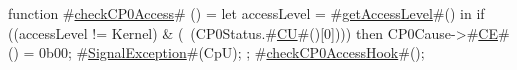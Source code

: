 function #\hyperref[sailMIPSzcheckCP0Access]{checkCP0Access}# () =
  {
    let accessLevel = #\hyperref[sailMIPSzgetAccessLevel]{getAccessLevel}#() in
    if ((accessLevel != Kernel) & (~(CP0Status.#\hyperref[sailMIPSzCU]{CU}#()[0]))) then
      {
        CP0Cause->#\hyperref[sailMIPSzCE]{CE}#() = 0b00;
        #\hyperref[sailMIPSzSignalException]{SignalException}#(CpU);
      };
    #\hyperref[sailMIPSzcheckCP0AccessHook]{checkCP0AccessHook}#();
  }
